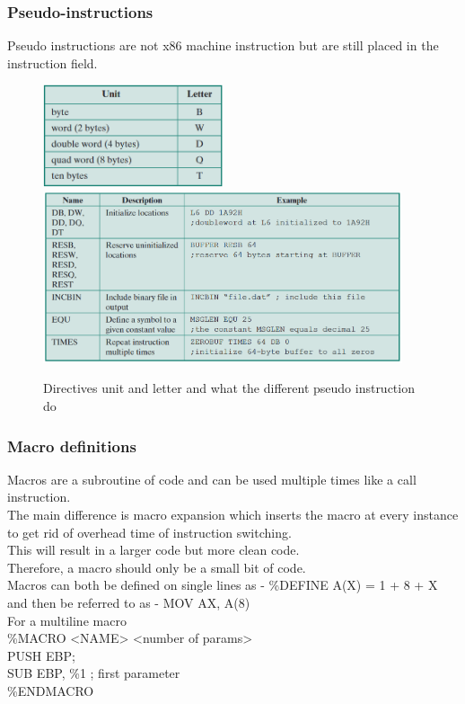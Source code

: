 \documentclass[12pt, a4paper]{article}
\begin{document}
			\subsubsection{Pseudo-instructions}
				Pseudo instructions are not x86 machine instruction but are still placed in the instruction field.\\
				\begin{figure}
					\includegraphics[width=200px]{assets/assemblyDirectives.png}\\
					\includegraphics[width=400px]{assets/x86Directives.png}
					\caption{Directives unit and letter and what the different pseudo instruction do}
					\centering
				\end{figure}
			\subsubsection{Macro definitions}
				Macros are a subroutine of code and can be used multiple times like a call instruction.\\
				The main difference is macro expansion which inserts the macro at every instance to get rid of overhead time of instruction switching.\\
				This will result in a larger code but more clean code. \\
				Therefore, a macro should only be a small bit of code.\\
				Macros can both be defined on single lines as - \%DEFINE A(X) = 1 + 8 + X and then be referred to as - MOV AX, A(8)\\
				For a multiline macro \\
				\%MACRO <NAME> <number of params>\\
					PUSH EBP;\\
					SUB EBP, \%1 ; first parameter\\
				\%ENDMACRO\\
\end{document}

